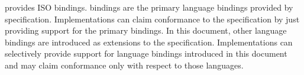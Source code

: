 \openshmem provides ISO \Cstd bindings. \Cstd bindings are the primary language
bindings provided by \openshmem specification. Implementations can claim
conformance to the specification by just providing support for the primary \Cstd
bindings. In this document, other language bindings are introduced as extensions
to the \openshmem specification. Implementations can selectively provide support
for language bindings introduced in this document and may claim conformance only
with respect to those languages.
